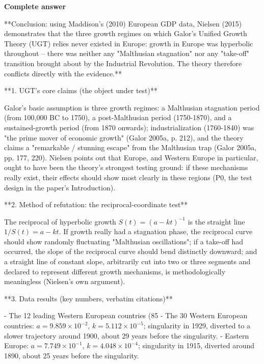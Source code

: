 \documentclass[10pt]{article}
\begin{document}
\textbf{Complete answer}
\begin{AnswerText}
**Conclusion: using Maddison's (2010) European GDP data, Nielsen (2015) demonstrates that the three growth regimes on which Galor's Unified Growth Theory (UGT) relies never existed in Europe: growth in Europe was hyperbolic throughout -- there was neither any "Malthusian stagnation" nor any "take-off" transition brought about by the Industrial Revolution. The theory therefore conflicts directly with the evidence.**

**1. UGT's core claims (the object under test)**

Galor's basic assumption is three growth regimes: a Malthusian stagnation period (from 100,000 BC to 1750), a post-Malthusian period (1750-1870), and a sustained-growth period (from 1870 onwards); industrialization (1760-1840) was "the prime mover of economic growth" (Galor 2005a, p. 212), and the theory claims a "remarkable / stunning escape" from the Malthusian trap (Galor 2005a, pp. 177, 220). Nielsen points out that Europe, and Western Europe in particular, ought to have been the theory's strongest testing ground: if these mechanisms really exist, their effects should show most clearly in these regions (P0, the test design in the paper's Introduction).

**2. Method of refutation: the reciprocal-coordinate test**

The reciprocal of hyperbolic growth $S(t)=(a-kt)^{-1}$ is the straight line $1/S(t)=a-kt$. If growth really had a stagnation phase, the reciprocal curve should show randomly fluctuating "Malthusian oscillations"; if a take-off had occurred, the slope of the reciprocal curve should bend distinctly downward; and a straight line of constant slope, arbitrarily cut into two or three segments and declared to represent different growth mechanisms, is methodologically meaningless (Nielsen's own argument).

**3. Data results (key numbers, verbatim citations)**

- The 12 leading Western European countries (85%
- The 30 Western European countries: $a=9.859\times10^{-2}$, $k=5.112\times10^{-5}$; singularity in 1929, diverted to a slower trajectory around 1900, about 29 years before the singularity.
- Eastern Europe: $a=7.749\times10^{-1}$, $k=4.048\times10^{-4}$; singularity in 1915, diverted around 1890, about 25 years before the singularity.


\end{AnswerText}
\end{document}
